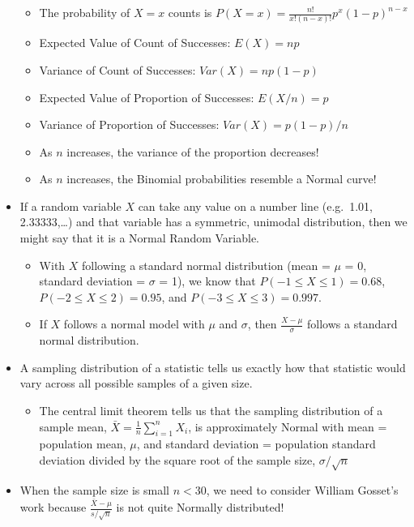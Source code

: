 \documentclass[]{book}
\providecommand{\tightlist}{%
  \setlength{\itemsep}{0pt}\setlength{\parskip}{0pt}}
\begin{document}
\begin{itemize}
  \begin{itemize}
  \tightlist
  \item
    The probability of \(X = x\) counts is \(P(X = x) = \frac{n!}{x!(n-x)!} p^x(1-p)^{n-x}\)
  \item
    Expected Value of Count of Successes: \(E(X) = np\)
  \item
    Variance of Count of Successes: \(Var(X) = np(1-p)\)
  \item
    Expected Value of Proportion of Successes: \(E(X/n) = p\)
  \item
    Variance of Proportion of Successes: \(Var(X) = p(1-p)/n\)
  \item
    As \(n\) increases, the variance of the proportion decreases!
  \item
    As \(n\) increases, the Binomial probabilities resemble a Normal curve!
  \end{itemize}
\item
  If a random variable \(X\) can take any value on a number line (e.g.~1.01, 2.33333,\ldots{}) and that variable has a symmetric, unimodal distribution, then we might say that it is a Normal Random Variable.

  \begin{itemize}
  \tightlist
  \item
    With \(X\) following a standard normal distribution (mean = \(\mu\) = 0, standard deviation = \(\sigma\) = 1), we know that \(P(-1\leq X \leq 1) = 0.68\), \(P(-2\leq X \leq 2) = 0.95\), and \(P(-3\leq X \leq 3) = 0.997\).
  \item
    If \(X\) follows a normal model with \(\mu\) and \(\sigma\), then \(\frac{X-\mu}{\sigma}\) follows a standard normal distribution.
  \end{itemize}
\item
  A sampling distribution of a statistic tells us exactly how that statistic would vary across all possible samples of a given size.

  \begin{itemize}
  \tightlist
  \item
    The central limit theorem tells us that the sampling distribution of a sample mean, \(\bar{X} = \frac{1}{n}\sum_{i=1}^n X_i\), is approximately Normal with mean = population mean, \(\mu\), and standard deviation = population standard deviation divided by the square root of the sample size, \(\sigma/\sqrt{n}\)
  \end{itemize}
\item
  When the sample size is small \(n<30\), we need to consider William Gosset's work because \(\frac{\bar{X} - \mu}{s/\sqrt{n}}\) is not quite Normally distributed!
\end{itemize}
\end{document}

